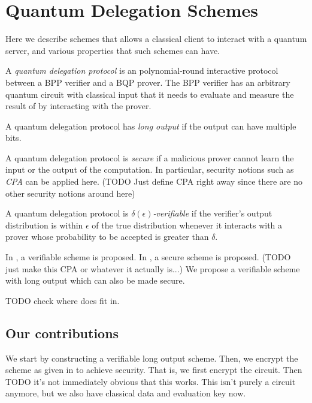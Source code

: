 \section{Quantum Delegation Schemes}

Here we describe schemes that allows a classical client to interact with a quantum server, and various properties that such schemes can have.

\begin{definition}
	A \emph{quantum delegation protocol} is an polynomial-round interactive protocol between a BPP verifier and a BQP prover. The BPP verifier has an arbitrary quantum circuit with classical input that it needs to evaluate and measure the result of by interacting with the prover.
\end{definition}

\begin{definition}
	A quantum delegation protocol has \emph{long output} if the output can have multiple bits.
\end{definition}

\begin{definition}
	A quantum delegation protocol is \emph{secure} if a malicious prover cannot learn the input or the output of the computation. In particular, security notions such as \emph{CPA} can be applied here. (TODO Just define CPA right away since there are no other security notions around here)
\end{definition}

\begin{definition}
	A quantum delegation protocol is \emph{$\delta(\epsilon)$-verifiable} if the verifier's output distribution is within $\epsilon$ of the true distribution whenever it interacts with a prover whose probability to be accepted is greater than $\delta$.
\end{definition}

In \cite{mahadev_delegation}, a verifiable scheme is proposed. In \cite{mahadev_qfhe}, a secure scheme is proposed. (TODO just make this CPA or whatever it actually is...) We propose a verifiable scheme with long output which can also be made secure.

TODO check where does \cite{1904.06320} fit in.

\subsection{Our contributions}

We start by constructing a verifiable long output scheme. Then, we encrypt the scheme as given in \cite{mahadev_delegation} to achieve security. That is, we first encrypt the circuit. Then TODO it's not immediately obvious that this works. This isn't purely a circuit anymore, but we also have classical data and evaluation key now.
